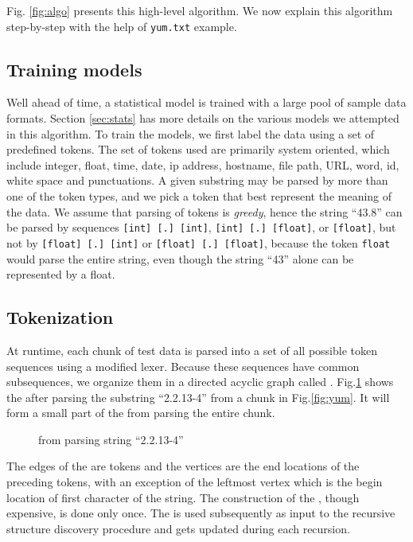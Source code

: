 Fig. \ref{fig:algo} presents this high-level algorithm. We now explain
this algorithm step-by-step with the help of {\tt yum.txt} example.

\subsection{Training models}
Well ahead of time, a statistical model is trained with
a large pool of sample data formats. Section \ref{sec:stats} has more details
on the various models we attempted in this algorithm. To train the models,
we first label the data using a set of predefined tokens. The set of tokens
used are primarily system oriented, which include
integer, float, time, date, ip address, hostname, file path, URL, 
word, id, white space and punctuations. 
A given substring may be parsed by more than one of the token
types, and we pick a token that best represent the meaning of the data.
We assume that parsing of tokens is {\em greedy}, hence
the string ``43.8'' can be parsed by sequences 
{\tt [int] [.] [int]}, {\tt [int] [.] [float]}, or {\tt [float]},
but not by {\tt [float] [.] [int]} or {\tt [float] [.] [float]},
because the token {\tt float} would parse the entire string, even though
the string ``43'' alone can be represented by a float.

\subsection{Tokenization}
At runtime, each chunk of test data is parsed into a set of all possible 
token sequences using a modified lexer. Because these sequences have
common subsequences, we organize them in a directed acyclic graph
called \seqset. Fig.\ref{fig:seqset} shows the \seqset{} after parsing 
the substring ``2.2.13-4'' from a chunk in Fig.\ref{fig:yum}. It will
form a small part of the \seqset{} from parsing the entire chunk.

\begin{figure}[th]
\begin{center}
\end{center}
\caption{\seqset{} from parsing string ``2.2.13-4''}\label{fig:seqset}
\end{figure}

The edges of the \seqset{} are tokens and the vertices are the end locations
of the preceding tokens, with an exception of the leftmost vertex which
is the begin location of first character of the string.
The construction of the \seqset, though expensive, is done only once.
The \seqset{} is used subsequently as input to the recursive 
structure discovery procedure and gets updated during each recursion.

